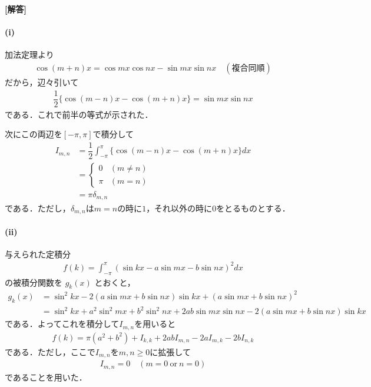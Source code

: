 \documentclass[../../main.tex]{subfiles}
\begin{document}
\begin{oframed}
  
\end{oframed}

{\bf [解答]}

\paragraph{(i)}

加法定理より
\begin{align}
  \cos(m+n)x = \cos mx \cos nx - \sin mx \sin nx \quad (\text{複合同順})
\end{align}
だから，辺々引いて
\begin{align}
  \dfrac{1}{2} \{ \cos(m-n)x - \cos(m+n)x \} = \sin mx \sin nx
\end{align}
である．これで前半の等式が示された．

次にこの両辺を$[-\pi,\pi]$で積分して
\begin{align}
  I_{m,n}
  &= \dfrac{1}{2} \int_{-\pi}^{\pi} \{ \cos(m-n)x - \cos(m+n)x \} dx \\
  &=
  \begin{cases} 0 & (m \neq n) \\ \pi & (m = n)
  \end{cases} \\
  &= \pi \delta_{m,n} \label{eq:1}
\end{align}
である．ただし，$\delta_{m,n}$は$m=n$の時に$1$，それ以外の時に$0$をとるものとする．

\paragraph{(ii)}

与えられた定積分
\begin{align}
  f(k) = \int_{-\pi}^\pi{(\sin kx - a \sin mx - b \sin nx)}^2 dx
\end{align}
の被積分関数を $g_k(x)$ とおくと，
\begin{align}
  g_k(x)
  & = \sin^2 kx - 2(a \sin mx + b \sin nx) \sin kx + (a \sin mx + b \sin nx)^2\\
  & = \sin^2 kx + a^2 \sin^2 mx + b^2 \sin^2 nx + 2ab \sin mx \sin nx - 2(a \sin mx + b \sin nx) \sin kx
\end{align}
である．よってこれを積分して$I_{m,n}$を用いると
\begin{align}
  f(k) = \pi(a^2+b^2) + I_{k,k}+ 2ab I_{m,n} - 2a I_{m,k} - 2b I_{n,k} \label{eq:2}
\end{align}
である．ただし，ここで$I_{m,n}$を$m,n \ge 0$に拡張して
\begin{align}
  I_{m,n} = 0 \quad (m=0 \ \text{or} \ n=0)
\end{align}
であることを用いた．
\end{document}
